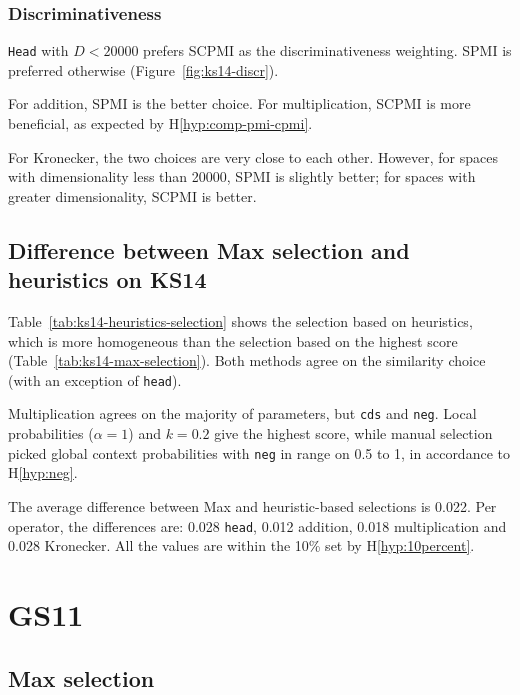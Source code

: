 \subsubsection{Discriminativeness}


\texttt{Head} with $D < 20000$ prefers SCPMI as the discriminativeness weighting. SPMI is preferred otherwise (Figure~\ref{fig:ks14-discr}).

For addition, SPMI is the better choice. For multiplication, SCPMI is more beneficial, as expected by H\ref{hyp:comp-pmi-cpmi}.

For Kronecker, the two choices are very close to each other. However, for spaces with dimensionality less than 20000, SPMI is slightly better; for spaces with greater dimensionality, SCPMI is better.

\subsection{Difference between Max selection and heuristics on KS14}

Table~\ref{tab:ks14-heuristics-selection} shows the selection based on heuristics, which is more homogeneous than the selection based on the highest score (Table~\ref{tab:ks14-max-selection}). Both methods agree on the similarity choice (with an exception of \texttt{head}).

Multiplication agrees on the majority of parameters, but \texttt{cds} and \texttt{neg}. Local probabilities ($\alpha = 1$) and $k = 0.2$ give the highest score, while manual selection picked global context probabilities with \texttt{neg} in range on 0.5 to 1, in accordance to H\ref{hyp:neg}.

The average difference between Max and heuristic-based selections is 0.022. Per operator, the differences are: 0.028 \texttt{head}, 0.012 addition, 0.018 multiplication and 0.028 Kronecker. All the values are within the 10\% set by H\ref{hyp:10percent}.

\section{GS11}
\label{sec:gs11}

\subsection{Max selection}
\label{sec:max-selection-gs11}



